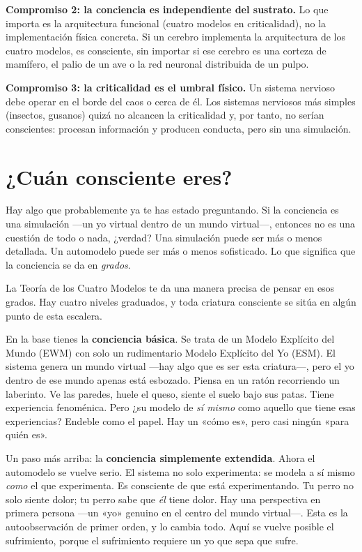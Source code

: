\documentclass[11pt, twoside, openright]{book}
\begin{document}
\textbf{Compromiso 2: la conciencia es independiente del sustrato.} Lo que importa es la arquitectura funcional (cuatro modelos en criticalidad), no la implementación física concreta. Si un cerebro implementa la arquitectura de los cuatro modelos, es consciente, sin importar si ese cerebro es una corteza de mamífero, el palio de un ave o la red neuronal distribuida de un pulpo.

\textbf{Compromiso 3: la criticalidad es el umbral físico.} Un sistema nervioso debe operar en el borde del caos o cerca de él. Los sistemas nerviosos más simples (insectos, gusanos) quizá no alcancen la criticalidad y, por tanto, no serían conscientes: procesan información y producen conducta, pero sin una simulación.

\section*{¿Cuán consciente eres?}

Hay algo que probablemente ya te has estado preguntando. Si la conciencia es una simulación ---un yo virtual dentro de un mundo virtual---, entonces no es una cuestión de todo o nada, ¿verdad? Una simulación puede ser más o menos detallada. Un automodelo puede ser más o menos sofisticado. Lo que significa que la conciencia se da en \textit{grados}.

La Teoría de los Cuatro Modelos te da una manera precisa de pensar en esos grados. Hay cuatro niveles graduados, y toda criatura consciente se sitúa en algún punto de esta escalera.

En la base tienes la \textbf{conciencia básica}. Se trata de un Modelo Explícito del Mundo (EWM) con solo un rudimentario Modelo Explícito del Yo (ESM). El sistema genera un mundo virtual ---hay algo que es ser esta criatura---, pero el yo dentro de ese mundo apenas está esbozado. Piensa en un ratón recorriendo un laberinto. Ve las paredes, huele el queso, siente el suelo bajo sus patas. Tiene experiencia fenoménica. Pero ¿su modelo de \textit{sí mismo} como aquello que tiene esas experiencias? Endeble como el papel. Hay un «cómo es», pero casi ningún «para quién es».

Un paso más arriba: la \textbf{conciencia simplemente extendida}. Ahora el automodelo se vuelve serio. El sistema no solo experimenta: se modela a sí mismo \textit{como} el que experimenta. Es consciente de que está experimentando. Tu perro no solo siente dolor; tu perro sabe que \textit{él} tiene dolor. Hay una perspectiva en primera persona ---un «yo» genuino en el centro del mundo virtual---. Esta es la autoobservación de primer orden, y lo cambia todo. Aquí se vuelve posible el sufrimiento, porque el sufrimiento requiere un yo que sepa que sufre.
\end{document}
